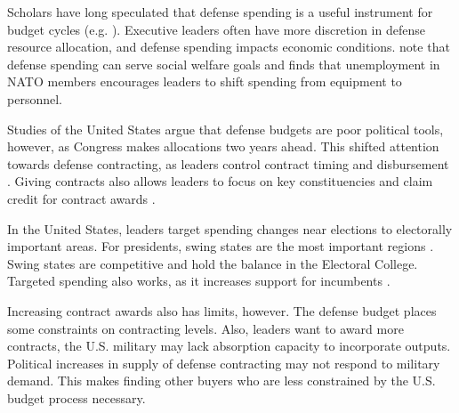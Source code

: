 \documentclass[12pt]{article}
\begin{document}
Scholars have long speculated that defense spending is a useful instrument for budget cycles (e.g. \cite{Tufte1978, Mintz1988}).
Executive leaders often have more discretion in defense resource allocation, and defense spending impacts economic conditions.
\citet{WhittenWilliams2011} note that defense spending can serve social welfare goals and \citet{Becker2021} finds that unemployment in NATO members encourages leaders to shift spending from equipment to personnel.


Studies of the United States argue that defense budgets are poor political tools, however, as Congress makes allocations two years ahead.
This shifted attention towards defense contracting, as leaders control contract timing and disbursement \citep{Mayer1995, DerouenHeo2000}.
Giving contracts also allows leaders to focus on key constituencies and claim credit for contract awards \citep{DerouenHeo2000}. 


In the United States, leaders target spending changes near elections to electorally important areas.
For presidents, swing states are the most important regions \citep{KrinerReeves2015}.
Swing states are competitive and hold the balance in the Electoral College. 
Targeted spending also works, as it increases support for incumbents \citep{KrinerReeves2012}.




Increasing contract awards also has limits, however. 
The defense budget places some constraints on contracting levels. 
Also, leaders want to award more contracts, the U.S. military may lack absorption capacity to incorporate outputs.
Political increases in supply of defense contracting may not respond to military demand.
This makes finding other buyers who are less constrained by the U.S. budget process necessary.
\end{document}
